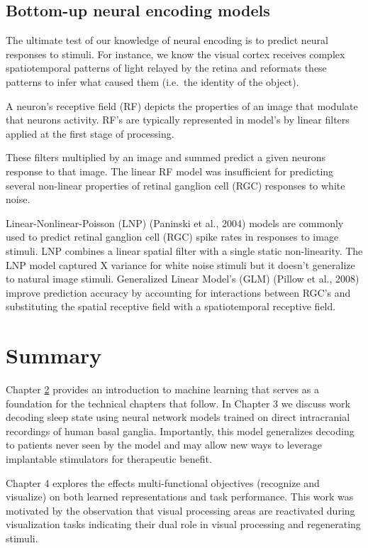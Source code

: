 \documentclass{templates/ucdenverthesis}
\begin{document}
\hypertarget{bottom-up-neural-encoding-models}{%
\subsection{Bottom-up neural encoding models}\label{bottom-up-neural-encoding-models}}

The ultimate test of our knowledge of neural encoding is to predict neural responses to stimuli. For instance, we know the visual cortex receives complex spatiotemporal patterns of light relayed by the retina and reformats these patterns to infer what caused them (i.e.~the identity of the object).

A neuron's receptive field (RF) depicts the properties of an image that modulate that neurons activity. RF's are typically represented in model's by linear filters applied at the first stage of processing.

These filters multiplied by an image and summed predict a given neurons response to that image. The linear RF model was insufficient for predicting several non-linear properties of retinal ganglion cell (RGC) responses to white noise.

Linear-Nonlinear-Poisson (LNP) (Paninski et al., 2004) models are commonly used to predict retinal ganglion cell (RGC) spike rates in responses to image stimuli.
LNP combines a linear spatial filter with a single static non-linearity.
The LNP model captured X variance for white noise stimuli but it doesn't generalize to natural image stimuli.
Generalized Linear Model's (GLM) (Pillow et al., 2008) improve prediction accuracy by accounting for interactions between RGC's and substituting the spatial receptive field with a spatiotemporal receptive field.

\hypertarget{sec:ch1summary}{%
\section{Summary}\label{sec:ch1summary}}

Chapter \protect\hyperlink{ch:mlprimer}{2} provides an introduction to machine learning that serves as a foundation for the technical chapters that follow.
In Chapter 3 we discuss work decoding sleep state using neural network models trained on direct intracranial recordings of human basal ganglia.
Importantly, this model generalizes decoding to patients never seen by the model and may allow new ways to leverage implantable stimulators for therapeutic benefit.

Chapter 4 explores the effects multi-functional objectives (recognize and visualize) on both learned representations and task performance. This work was motivated by the observation that visual processing areas are reactivated during visualization tasks indicating their dual role in visual processing and regenerating stimuli.
\end{document}
